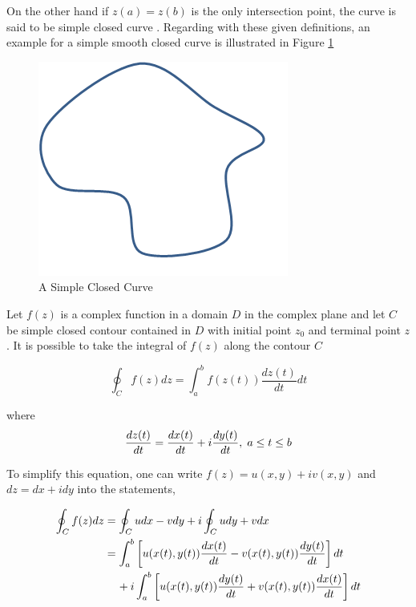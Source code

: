 On the other hand if  $z(a)=z(b)$ is the only intersection point, the curve is said to be simple closed curve \cite{wiki_contour}. Regarding with these given definitions, an example for a  simple smooth closed curve is illustrated in Figure \ref{simple_closed_curve_ref}

\begin{figure}[H]
\caption{A Simple Closed Curve} \label{simple_closed_curve_ref}
\centering
\includegraphics[scale = 0.60]{simple_closed_curve}
\end{figure}
		
Let $f(z)$ is a complex function in a domain $D$ in the complex plane and let $C$ be simple closed contour contained in $D$ with initial point $z_0$ and terminal point  $z$. It is possible to take the integral of $f(z)$ along the contour $C$ \cite{wiki_contour}
		
\begin{equation}
\oint_C f(z) dz = \int_{a}^{b} f(z(t))\frac{dz(t)}{dt} dt
\end{equation}
		
where
\begin{equation}
\frac{dz(t)}{dt} = \frac{dx(t)}{dt} + i\frac{dy(t)}{dt},   \hspace{0.1cm} a\leq t\leq b
\end{equation}
		
To simplify this equation, one can write $f(z) = u(x,y) + iv(x,y)$ and $dz = dx + idy$ into the statements,
		
\begin{align} \label{contour_integral}
\begin{split}
\oint_C f(z)dz & = \oint_C u dx - v dy + i \oint_C u dy + v dx \\
&= \int_{a}^{b}\left[u(x(t),y(t) )\frac{dx(t)}{dt} - v(x(t),y(t) )\frac{dy(t)}{dt}\right]dt\\
& \hspace{0.4cm} + i\int_{a}^{b} \left[u(x(t),y(t) )\frac{dy(t)}{dt} + v(x(t),y(t) )\frac{dx(t)}{dt}\right]dt
\end{split}
\end{align}

